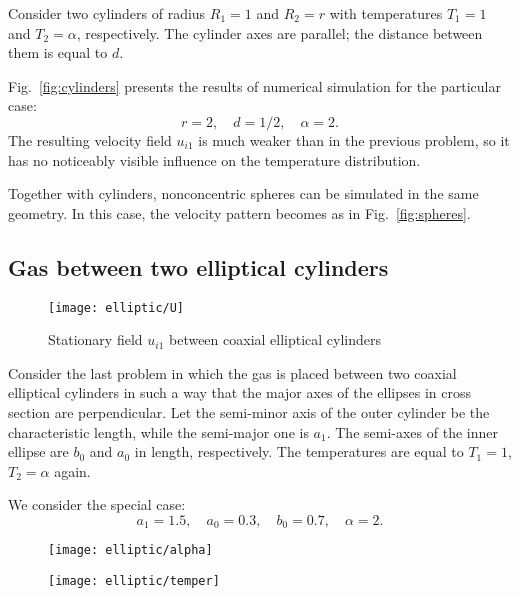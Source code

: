 \documentclass[english,a4paper,10pt]{article}
\begin{document}
Consider two cylinders of radius \(R_1 = 1\) and \(R_2 = r\)
with temperatures \(T_1 = 1\) and \(T_2 = \alpha\), respectively.
The cylinder axes are parallel; the distance between them is equal to \(d\).

Fig.~\ref{fig:cylinders} presents the results of numerical simulation for the particular case:
\[ r = 2, \quad d = 1/2, \quad \alpha = 2. \]
The resulting velocity field \(u_{i1}\) is much weaker than in the previous problem,
so it has no noticeably visible influence on the temperature distribution.

Together with cylinders, nonconcentric spheres can be simulated in the same geometry.
In this case, the velocity pattern becomes as in Fig.~\ref{fig:spheres}.

\subsection{Gas between two elliptical cylinders}

\begin{figure}
	\centering
	\texttt{[image: elliptic/U]}
	\caption{Stationary field \(u_{i1}\) between coaxial elliptical cylinders}
	\label{fig:elliptic}
\end{figure}

Consider the last problem in which the gas is placed between two coaxial elliptical cylinders
in such a way that the major axes of the ellipses in cross section are perpendicular.
Let the semi-minor axis of the outer cylinder be the characteristic length, while the semi-major one is \(a_1\).
The semi-axes of the inner ellipse are \(b_0\) and \(a_0\) in length, respectively.
The temperatures are equal to \(T_1 = 1\), \(T_2 = \alpha\) again.

We consider the special case:
\[ a_1 = 1.5, \quad a_0 = 0.3, \quad b_0 = 0.7, \quad \alpha = 2. \]

\begin{figure}[ht]
	\centering
	\begin{minipage}{.48\textwidth}
		\centering
		\texttt{[image: elliptic/alpha]}
		\label{fig:maxU}
	\end{minipage}
	\quad
	\begin{minipage}{.48\textwidth}
		\centering
		\texttt{[image: elliptic/temper]}
 		\vspace{-11pt}
		\label{fig:deltaT}
	\end{minipage}
\end{figure}
\end{document}
